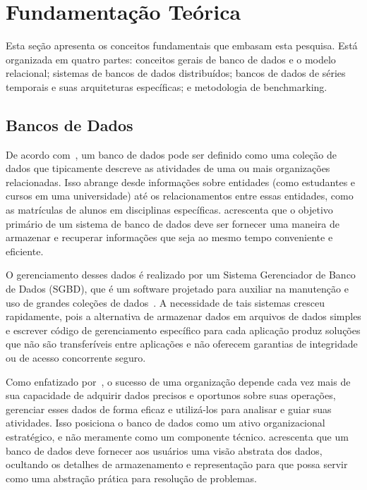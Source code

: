 \section{Fundamentação Teórica}
\label{sec:theoretical}

Esta seção apresenta os conceitos fundamentais que embasam esta pesquisa. Está organizada em
quatro partes: conceitos gerais de banco de dados e o modelo relacional; sistemas de bancos de
dados distribuídos; bancos de dados de séries temporais e suas arquiteturas específicas; e
metodologia de benchmarking.

\subsection{Bancos de Dados}

De acordo com~\cite{Ramakrishnan2003}, um banco de dados pode ser definido como uma coleção de
dados que tipicamente descreve as atividades de uma ou mais organizações relacionadas.
Isso abrange desde informações sobre entidades (como estudantes e cursos em uma universidade)
até os relacionamentos entre essas entidades, como as matrículas de alunos em disciplinas
específicas. \cite{silberschatz2020} acrescenta que o objetivo primário de um sistema de banco de
dados deve ser fornecer uma maneira de armazenar e recuperar informações que seja ao mesmo tempo
conveniente e eficiente.

O gerenciamento desses dados é realizado por um Sistema Gerenciador de Banco de Dados (SGBD),
que é um software projetado para auxiliar na manutenção e uso de grandes coleções de
dados~\citep{Ramakrishnan2003}. A necessidade de tais sistemas cresceu rapidamente, pois a
alternativa de armazenar dados em arquivos de dados simples e escrever código de gerenciamento específico
para cada aplicação produz soluções que não são transferíveis entre aplicações e não oferecem
garantias de integridade ou de acesso concorrente seguro.

Como enfatizado por~\cite{Ramakrishnan2003}, o sucesso de uma organização depende cada vez mais
de sua capacidade de adquirir dados precisos e oportunos sobre suas operações, gerenciar esses
dados de forma eficaz e utilizá-los para analisar e guiar suas atividades. Isso posiciona o banco
de dados como um ativo organizacional estratégico, e não meramente como um componente técnico.
\cite{silberschatz2020} acrescenta que um banco de dados deve fornecer aos usuários uma visão
abstrata dos dados, ocultando os detalhes de armazenamento e representação para que possa servir
como uma abstração prática para resolução de problemas.

